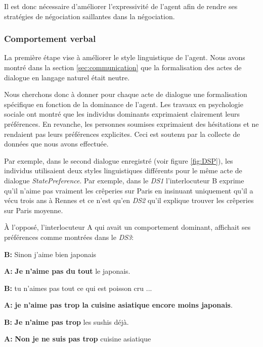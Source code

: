 Il est donc nécessaire d'améliorer l'expressivité de l'agent afin de rendre ses stratégies de négociation saillantes dans la négociation. 

\subsubsection{Comportement verbal}

La première étape vise à améliorer le style linguistique de l'agent. Nous avons montré dans la section \ref{sec:communication} que la formalisation des actes de dialogue en langage naturel était neutre. 

Nous cherchons donc à donner pour chaque acte de dialogue une formalisation spécifique en fonction de la dominance de l'agent. Les travaux en psychologie sociale ont montré que les individus dominants exprimaient clairement leurs préférences. En revanche, les personnes soumises exprimaient des hésitations et ne rendaient pas leurs préférences explicites.  Ceci est soutenu par la collecte de données que nous avons effectuée.

Par exemple, dans le second dialogue enregistré (voir figure \ref{fig:DSP}), les individus utilisaient deux styles linguistiques différents pour le même acte de dialogue \emph{StatePreference}. Par exemple, dans le \emph{DS1} l'interlocuteur B exprime qu'il n'aime pas vraiment les crêperies sur Paris en insinuant uniquement qu'il a vécu trois ans à Rennes et ce n'est qu'en \emph{DS2} qu'il explique trouver les crêperies sur Paris moyenne.

À l'opposé, l'interlocuteur A qui avait un comportement dominant, affichait ses préférences comme montrées dans le \emph{DS3}:

\begin{minipage}{\textwidth}     {\ttfamily
		
		\begin{addmargin}[1em]{2em}%
			
			\vspace{0.5em}
			
			\hspace*{3mm} \textbf{B:}  Sinon j'aime bien japonais 
			
			\textbf{A:} \textbf{Je n'aime pas du tout} le japonais.
			
			\hspace*{3mm}     \textbf{B:} tu n'aimes pas tout ce qui est poisson cru ... 
			
			\textbf{A:}  \textbf{je n'aime pas trop la cuisine asiatique encore moins japonais}.
			
			\hspace*{3mm}     \textbf{B:} \textbf{Je n'aime pas trop }les sushis déjà.
			
			\textbf{A:} \textbf{Non je ne suis pas trop} cuisine asiatique        \vspace{1.5em}      \end{addmargin}     } 
	
\end{minipage}

